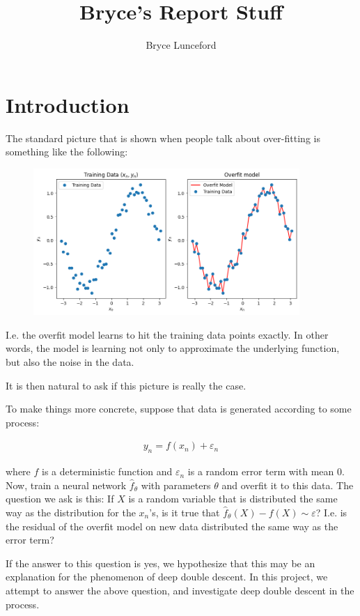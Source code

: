 \documentclass{article}
\title{Bryce's Report Stuff}
\author{Bryce Lunceford}
\date{}
\begin{document}
\maketitle

\section{Introduction}
The standard picture that is shown when people talk about over-fitting is something like the following:
\begin{figure}[H]
    \centering
    \includegraphics[width=0.9\textwidth]{figures/overfit.png}
\end{figure}
I.e. the overfit model learns to hit the training data points exactly.
In other words, the model is learning not only to approximate the underlying function, but also the noise in the data.

It is then natural to ask if this picture is really the case.

To make things more concrete, suppose that data is generated according to some process:

\begin{align*}
    y_n = f(x_n) + \varepsilon_n
\end{align*}

where $f$ is a deterministic function and $\varepsilon_n$ is a random error term with mean $0$.
Now, train a neural network $\hat{f}_\theta$ with parameters $\theta$ and overfit it to this data.
The question we ask is this:
If $X$ is a random variable that is distributed the same way as the distribution for the $x_n$'s, is it true that $\hat{f}_\theta(X) - f(X) \sim \varepsilon$?
I.e. is the residual of the overfit model on new data distributed the same way as the error term?

If the answer to this question is yes, we hypothesize that this may be an explanation for the phenomenon of deep double descent.
In this project, we attempt to answer the above question, and investigate deep double descent in the process.
\end{document}

